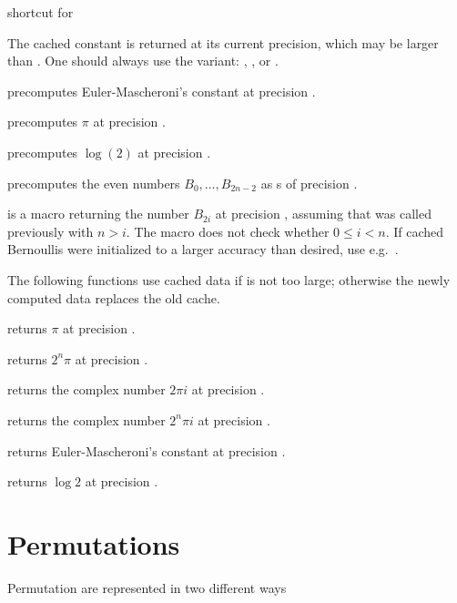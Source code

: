 shortcut for 


The cached constant is returned at its current precision, which may be larger
than . One should always use the  variant:
, , or .

 precomputes Euler-Mascheroni's constant
at precision .

 precomputes $\pi$ at precision .

 precomputes $\log(2)$ at precision
.

 precomputes the even 
numbers $B_0,\dots,B_{2n-2}$ as s of precision .

 is a macro returning the  number
$B_{2i}$ at precision , assuming that  was
called previously with $n > i$. The macro does not check whether
$0 \leq i < n$. If cached Bernoullis were initialized to a larger accuracy
than desired, use e.g.~.

The following functions use cached data if  is not too large;
otherwise the newly computed data replaces the old cache.

 returns $\pi$ at precision .

 returns $2^n\pi$ at precision .

 returns the complex number $2\pi i$ at
precision .

 returns the complex number $2^n\pi i$ at
precision .

 returns Euler-Mascheroni's constant at
precision .

 returns $\log 2$ at precision .



\section{Permutations }

\noindent Permutation are represented in two different ways

